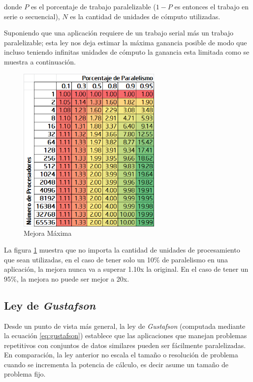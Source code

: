 \documentclass[a4paper]{report}
\begin{document}
donde $ P $ es el porcentaje de trabajo paralelizable ($ 1-P $ es entonces el trabajo en serie o secuencial), $ N $ es la cantidad de unidades de c\'omputo utilizadas.

\bigskip

Suponiendo que una aplicaci\'on requiere de un trabajo serial m\'as un trabajo paralelizable; esta ley nos deja estimar la m\'axima ganancia posible
de modo que incluso teniendo infinitas unidades de c\'omputo la ganancia esta limitada como se muestra a continuaci\'on.

\begin{figure}[H]
\begin{center}
\includegraphics[width=7cm]{amdahl.png}
\caption{Mejora M\'axima}
\label{fig:amdahl}
\end{center}
\end{figure}

La figura \ref{fig:amdahl} muestra que no importa la cantidad de unidades de
procesamiento que sean utilizadas, en el caso de tener solo un 10\% de paralelismo
en una aplicaci\'on, la mejora nunca va a superar 1.10x la original.
En el caso de tener un 95\%, la mejora no puede ser mejor a 20x.

\subsection{Ley de {\it Gustafson}}

Desde un punto de vista m\'as general, la ley de {\it Gustafson}
\cite{gustafson} (computada mediante la ecuaci\'on \ref{eq:gustafson})
establece que las aplicaciones que manejan problemas
repetitivos con conjuntos de datos similares pueden ser f\'acilmente
paralelizadas. En comparaci\'on, la ley anterior no escala el tama\~no o
resoluci\'on de problema cuando se incrementa la potencia de c\'alculo, es
decir asume un tama\~no de problema fijo. 
\end{document}
